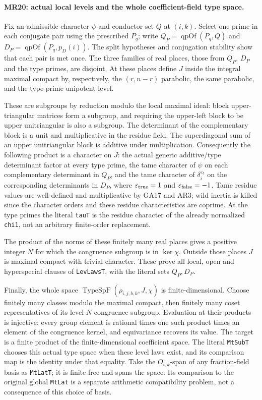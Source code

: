 \paragraph{MR20: actual local levels and the whole coefficient-field type space.}
Fix an admissible character $\psi$ and conductor set $Q$ at
$(i,k)$. Select one prime in each conjugate pair using the prescribed
$P_q$; write $Q_P=\operatorname{qpOf}(P_q,Q)$ and
$D_P=\operatorname{qpOf}(P_q,p_D(i))$. The split hypotheses and
conjugation stability show that each pair is met once. The three
families of real places, those from $Q_P$, $D_P$ and the type
primes, are disjoint. At these places define $J$ inside the
integral maximal compact by, respectively, the $(r,n-r)$
parabolic, the same parabolic, and the type-prime unipotent level.

These are subgroups by reduction modulo the local maximal ideal:
block upper-triangular matrices form a subgroup, and requiring the
upper-left block to be upper unitriangular is also a subgroup.
The determinant of the complementary block is a unit and
multiplicative in the residue field. The superdiagonal sum of an
upper unitriangular block is additive under multiplication.
Consequently the following product is a character on $J$:
the actual generic additive/type determinant factor at every type
prime, the tame character of $\psi$ on each complementary
determinant in $Q_P$, and the tame character of
$\delta_i^{\varepsilon_b}$ on the corresponding determinants in
$D_P$, where $\varepsilon_{\rm true}=1$ and
$\varepsilon_{\rm false}=-1$. Tame residue values are well-defined
and multiplicative by GA17 and AR3; wild inertia is killed since
the character orders and these residue characteristics are
coprime. At the type primes the literal \texttt{tauT} is the
residue character of the already normalized \texttt{chi1}, not
an arbitrary finite-order replacement.

The product of the norms of these finitely many real places gives
a positive integer $N$ for which the congruence subgroup is in
$\ker\chi$. Outside those places $J$ is maximal compact with
trivial character. These prove all local, open and hyperspecial
clauses of \texttt{LevLawsT}, with the literal sets $Q_P,D_P$.

Finally, the whole space
$\operatorname{TypeSpF}(\rho_{i,j,b,k},J,\chi)$ is finite-dimensional.
Choose finitely many classes modulo the maximal compact, then
finitely many coset representatives of its level-$N$ congruence
subgroup. Evaluation at their products is injective: every group
element is rational times one such product times an element of
the congruence kernel, and equivariance recovers its value.
The target is a finite product of the finite-dimensional coefficient
space. The literal \texttt{MtSubT} chooses this actual type space
when these level laws exist, and its comparison map is the identity
under that equality. Take the $O_{i,k}$-span of any fraction-field
basis as \texttt{MtLatT}; it is finite free and spans the space.
Its comparison to the original global \texttt{MtLat} is a separate
arithmetic compatibility problem, not a consequence of this choice
of basis.

